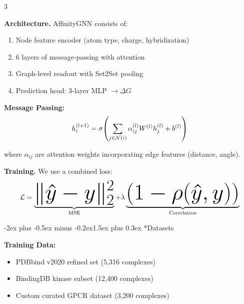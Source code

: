 \documentclass[a0paper,portrait]{article}
\makeatletter
\renewcommand{\section}{\@startsection{section}{1}{0pt}%
  {-2ex plus -0.5ex minus -0.2ex}{1.5ex plus 0.3ex}%
  {\fontsize{40}{48}\selectfont\bfseries\color{sectioncolor}}}
\newcommand{\posterbody}{\fontsize{28}{38}\selectfont}
\makeatother
\begin{document}
\begin{multicols}{3}
\vspace{1cm}

\textbf{Architecture.} AffinityGNN consists of:
\begin{enumerate}[leftmargin=1.5em, itemsep=10pt]
  \item Node feature encoder (atom type, charge, hybridization)
  \item 6 layers of message-passing with attention
  \item Graph-level readout with Set2Set pooling
  \item Prediction head: 3-layer MLP $\rightarrow \Delta G$
\end{enumerate}

\vspace{1cm}

\textbf{Message Passing:}
\begin{equation*}
  {\fontsize{32}{40}\selectfont h_i^{(l+1)} = \sigma\!\left( \sum_{j \in \mathcal{N}(i)} \alpha_{ij}^{(l)} W^{(l)} h_j^{(l)} + b^{(l)} \right)}
\end{equation*}

\vspace{0.5cm}
where $\alpha_{ij}$ are attention weights incorporating edge features (distance, angle).

\vspace{1cm}

\textbf{Training.} We use a combined loss:
\begin{equation*}
  {\fontsize{32}{40}\selectfont \mathcal{L} = \underbrace{\|\hat{y} - y\|_2^2}_{\text{MSE}} + \lambda \underbrace{(1 - \rho(\hat{y}, y))}_{\text{Correlation}}}
\end{equation*}

\vspace{1.5cm}

\section*{Datasets}

\posterbody

\textbf{Training Data:}
\begin{itemize}[leftmargin=1.5em, itemsep=10pt]
  \item PDBbind v2020 refined set (5,316 complexes)
  \item BindingDB kinase subset (12,400 complexes)
  \item Custom curated GPCR dataset (3,200 complexes)
\end{itemize}


\end{multicols}
\end{document}
